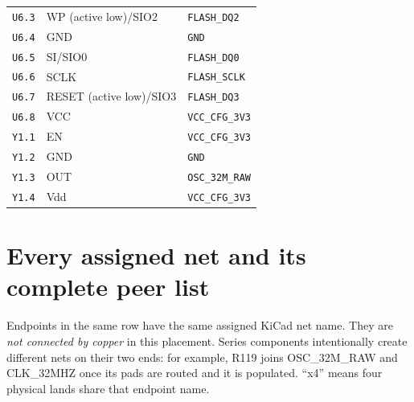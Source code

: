 \documentclass[11pt,a4paper]{article}
\begin{document}
\begin{longtable}{@{}P{25mm}P{62mm}P{83mm}@{}}
\nolinkurl{U6.3} & WP (active low)/SIO2 & \nolinkurl{FLASH_DQ2} \\
\nolinkurl{U6.4} & GND & \nolinkurl{GND} \\
\nolinkurl{U6.5} & SI/SIO0 & \nolinkurl{FLASH_DQ0} \\
\nolinkurl{U6.6} & SCLK & \nolinkurl{FLASH_SCLK} \\
\nolinkurl{U6.7} & RESET (active low)/SIO3 & \nolinkurl{FLASH_DQ3} \\
\nolinkurl{U6.8} & VCC & \nolinkurl{VCC_CFG_3V3} \\
\nolinkurl{Y1.1} & EN & \nolinkurl{VCC_CFG_3V3} \\
\nolinkurl{Y1.2} & GND & \nolinkurl{GND} \\
\nolinkurl{Y1.3} & OUT & \nolinkurl{OSC_32M_RAW} \\
\nolinkurl{Y1.4} & Vdd & \nolinkurl{VCC_CFG_3V3} \\
\end{longtable}\endgroup

\clearpage\section{Every assigned net and its complete peer list}
Endpoints in the same row have the same assigned KiCad net name. They are \emph{not connected by copper} in this placement. Series components intentionally create different nets on their two ends: for example, R119 joins OSC\_32M\_RAW and CLK\_32MHZ once its pads are routed and it is populated. ``x4'' means four physical lands share that endpoint name.
\end{document}
